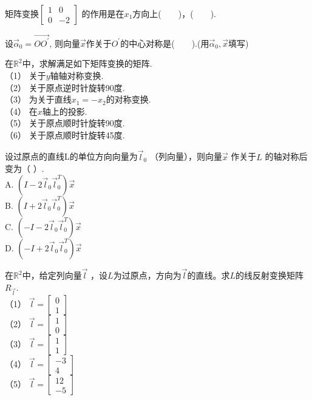 \begin{ex}\label{8.3}
矩阵变换$\begin{bmatrix}1&0\\0&-2\end{bmatrix}$ 的作用是在$x_1$方向上(~~~~)，(~~~~).
\end{ex}

\begin{ex}\label{8.4}
设$\vec{\alpha}_0=\vec{OO^{'}}$, 则向量$\vec{x}$作关于$O^{'}$的中心对称是(~~~~).(用$\vec{\alpha}_0,\vec{x}$填写)
\end{ex}

\begin{ex}\label{8.5}
在$\mathbb{R}^2$中，求解满足如下矩阵变换的矩阵.\\
（1） 关于$y$轴轴对称变换.\\
（2） 关于原点逆时针旋转90度.\\
（3） 为关于直线$x_1=-x_2$的对称变换.\\
（4） 在$x$轴上的投影.\\
（5） 关于原点顺时针旋转90度.\\
（6） 关于原点顺时针旋转45度.
\end{ex}

\begin{ex}\label{8.6}
设过原点的直线L的单位方向向量为$\vec{l}_0$ （列向量），则向量$\vec{x}$ 作关于$L$ 的轴对称后变为（     ）.\\
A. $(I-2\vec{l}_0 \vec{l}_0^T )\vec{x}$  \\
B. $(I+2\vec{l}_0 \vec{l}_0^T )\vec{x}$\\
C. $(-I-2\vec{l}_0 \vec{l}_0^T )\vec{x}$  \\
D. $(-I+2\vec{l}_0 \vec{l}_0^T )\vec{x}$
\end{ex}

\begin{ex}\label{8.7}
在$\mathbb{R}^2$中，给定列向量$\vec{l}$ ，设$L$为过原点，方向为$\vec{l}$的直线。求$L$的线反射变换矩阵$R_{\vec{l}}$.\\
（1） $\vec{l}=\begin{bmatrix}0\\1\end{bmatrix}$\\
（2） $\vec{l}=\begin{bmatrix}1\\0\end{bmatrix}$\\
（3） $\vec{l}=\begin{bmatrix}1\\1\end{bmatrix}$\\
（4） $\vec{l}=\begin{bmatrix}-3\\4\end{bmatrix}$\\
（5） $\vec{l}=\begin{bmatrix}12\\-5\end{bmatrix}$
\end{ex}

